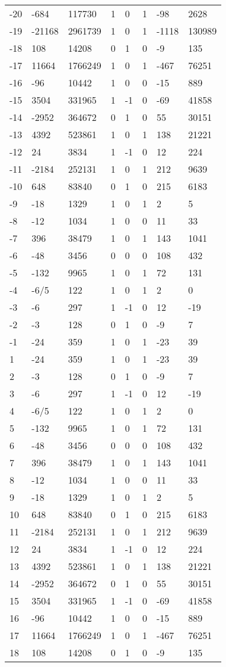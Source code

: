 \documentclass{amsart}
\begin{document}
\begin{longtable}{|l|l|l|lllll|}
-20&-684&117730&1&0&1&-98&2628\\
-19&-21168&2961739&1&0&1&-1118&130989\\
-18&108&14208&0&1&0&-9&135\\
-17&11664&1766249&1&0&1&-467&76251\\
-16&-96&10442&1&0&0&-15&889\\
-15&3504&331965&1&-1&0&-69&41858\\
-14&-2952&364672&0&1&0&55&30151\\
-13&4392&523861&1&0&1&138&21221\\
-12&24&3834&1&-1&0&12&224\\
-11&-2184&252131&1&0&1&212&9639\\
-10&648&83840&0&1&0&215&6183\\
-9&-18&1329&1&0&1&2&5\\
-8&-12&1034&1&0&0&11&33\\
-7&396&38479&1&0&1&143&1041\\
-6&-48&3456&0&0&0&108&432\\
-5&-132&9965&1&0&1&72&131\\
-4&-6/5&122&1&0&1&2&0\\
-3&-6&297&1&-1&0&12&-19\\
-2&-3&128&0&1&0&-9&7\\
-1&-24&359&1&0&1&-23&39\\
1&-24&359&1&0&1&-23&39\\
2&-3&128&0&1&0&-9&7\\
3&-6&297&1&-1&0&12&-19\\
4&-6/5&122&1&0&1&2&0\\
5&-132&9965&1&0&1&72&131\\
6&-48&3456&0&0&0&108&432\\
7&396&38479&1&0&1&143&1041\\
8&-12&1034&1&0&0&11&33\\
9&-18&1329&1&0&1&2&5\\
10&648&83840&0&1&0&215&6183\\
11&-2184&252131&1&0&1&212&9639\\
12&24&3834&1&-1&0&12&224\\
13&4392&523861&1&0&1&138&21221\\
14&-2952&364672&0&1&0&55&30151\\
15&3504&331965&1&-1&0&-69&41858\\
16&-96&10442&1&0&0&-15&889\\
17&11664&1766249&1&0&1&-467&76251\\
18&108&14208&0&1&0&-9&135\\

\end{longtable}
\end{document}
